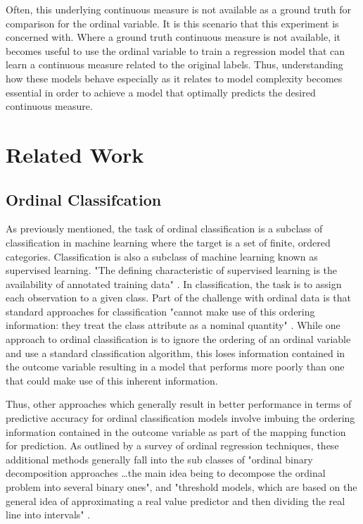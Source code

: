 \documentclass[10pt]{article}\usepackage[]{graphicx}\usepackage[]{xcolor}
\begin{document}
Often, this underlying continuous measure is not available as a ground truth for comparison for the ordinal variable. It is this scenario that this experiment is concerned with. Where a ground truth continuous measure is not available, it becomes useful to use the ordinal variable to train a regression model that can learn a continuous measure related to the original labels. Thus, understanding how these models behave especially as it relates to model complexity becomes essential in order to achieve a model that optimally predicts the desired continuous measure.






\newpage
\section{Related Work}

\subsection{Ordinal Classifcation}
As previously mentioned, the task of ordinal classification is a subclass of classification in machine learning where the target is a set of finite, ordered categories. Classification is also a subclass of machine learning known as supervised learning. "The defining characteristic of supervised learning is the availability of annotated training data" \cite{Cunning}. In classification, the task is to assign each observation to a given class. Part of the challenge with ordinal data is that standard approaches for classification "cannot make use of this ordering information: they treat the class attribute as a nominal quantity" \cite{Quote:Hall}. While one approach to ordinal classification is to ignore the ordering of an ordinal variable and use a standard classification algorithm, this loses information contained in the outcome variable resulting in a model that performs more poorly than one that could make use of this inherent information.

Thus, other approaches which generally result in better performance in terms of predictive accuracy for ordinal classification models involve imbuing the ordering information contained in the outcome variable as part of the mapping function for prediction. As outlined by a survey of ordinal regression techniques, these additional methods generally fall into the sub classes of "ordinal binary decomposition approaches \dots the main idea being to decompose the ordinal problem into several binary ones", and "threshold models, which are based on the general idea of approximating a real value predictor and then dividing the real line into intervals" \cite{Quote:Gutierrez}.
\end{document}
